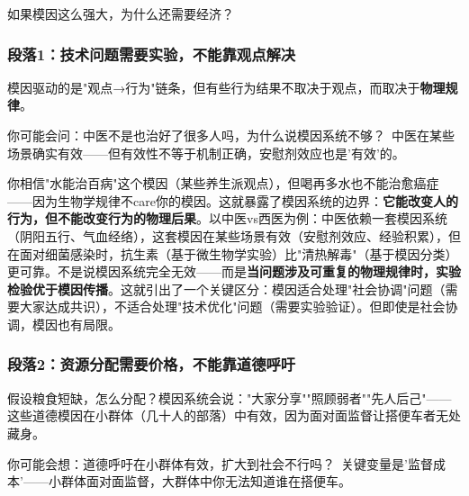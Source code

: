 \documentclass[../main.tex]{subfiles}
\begin{document}
	\begin{questionbox}

		如果模因这么强大，为什么还需要经济？

	\end{questionbox}

	\subsubsection*{段落1：技术问题需要实验，不能靠观点解决}

	模因驱动的是"观点→行为"链条，但有些行为结果不取决于观点，而取决于\textbf{物理规律}。

	\begin{tcolorbox}[colback=yellow!5, title=\textit{读者行为预测}]

		你可能会问：中医不是也治好了很多人吗，为什么说模因系统不够？\ 中医在某些场景确实有效——但有效性不等于机制正确，安慰剂效应也是'有效'的。

	\end{tcolorbox}

你相信"水能治百病"这个模因（某些养生派观点），但喝再多水也不能治愈癌症——因为生物学规律不care你的模因。这就暴露了模因系统的边界：\textbf{它能改变人的行为，但不能改变行为的物理后果}。以中医vs西医为例：中医依赖一套模因系统（阴阳五行、气血经络），这套模因在某些场景有效（安慰剂效应、经验积累），但在面对细菌感染时，抗生素（基于微生物学实验）比"清热解毒"（基于模因分类）更可靠。不是说模因系统完全无效——而是\textbf{当问题涉及可重复的物理规律时，实验检验优于模因传播}。这就引出了一个关键区分：模因适合处理"社会协调"问题（需要大家达成共识），不适合处理"技术优化"问题（需要实验验证）。但即使是社会协调，模因也有局限。

	\subsubsection*{段落2：资源分配需要价格，不能靠道德呼吁}

	假设粮食短缺，怎么分配？模因系统会说："大家分享""照顾弱者""先人后己"——这些道德模因在小群体（几十人的部落）中有效，因为面对面监督让搭便车者无处藏身。

	\begin{tcolorbox}[colback=yellow!5, title=\textit{读者行为预测}]

		你可能会想：道德呼吁在小群体有效，扩大到社会不行吗？\ 关键变量是'监督成本'——小群体面对面监督，大群体中你无法知道谁在搭便车。

	\end{tcolorbox}
\end{document}
